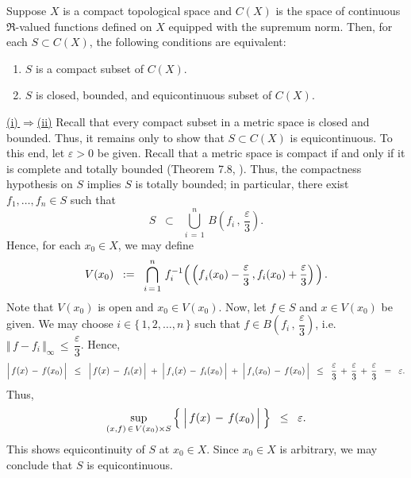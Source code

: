 \begin{theorem}
\label{ArzelaAscoliTheorem}
\mbox{}\vskip 0.1cm
\noindent
Suppose $X$ is a compact topological space and
$C(X)$ is the space of continuous $\Re$-valued functions defined on $X$ equipped with the supremum norm.
Then, for each $S \subset C(X)$, the following conditions are equivalent:
\begin{enumerate}
\item	$S$ is a compact subset of $C(X)$.
\item	$S$ is closed, bounded, and equicontinuous subset of $C(X)$.
\end{enumerate}
\end{theorem}
\proof
\vskip 0.1cm
\noindent
\underline{(i)\,\;$\Longrightarrow$\;(ii)}
\vskip 0.1cm
\noindent
Recall that every compact subset in a metric space is closed and bounded.
Thus, it remains only to show that $S \subset C(X)$ is equicontinuous.
To this end, let $\varepsilon > 0$ be given.
Recall that a metric space is compact if and only if it is complete and totally bounded (Theorem 7.8, \cite{Aliprantis1998}).
Thus, the compactness hypothesis on $S$ implies $S$ is totally bounded;
in particular, there exist $f_{1}, \ldots, f_{n} \in S$ such that
\begin{equation*}
S \;\; \subset \;\; \bigcup_{i\,=\,1}^{n}\,B\!\left(f_{i}\,,\,\dfrac{\varepsilon}{3}\right).
\end{equation*}
Hence, for each $x_{0} \in X$, we may define
\begin{equation*}
V(x_{0}) \;\; := \;\;
\bigcap_{i\,=\,1}^{n}\,
f_{i}^{-1}\!\left(\,
	\left(\overset{{\color{white}.}}{f}_{i}(x_{0})-\dfrac{\varepsilon}{3}\,,f_{i}(x_{0})+\dfrac{\varepsilon}{3}\right)
\,\right).
\end{equation*}
Note that $V(x_{0})$ is open and $x_{0} \in V(x_{0})$.
Now, let $f \in S$ and $x \in V(x_{0})$ be given.
We may choose $i \in \{\,1,2,\ldots,n\,\}$ such that $f \in B\!\left(f_{i}\,,\,\dfrac{\varepsilon}{3}\right)$,
i.e. $\Vert\,f-f_{i}\,\Vert_{\infty}\,\leq\,\dfrac{\varepsilon}{3}$.
Hence,
\begin{equation*}
\left\vert\,\overset{{\color{white}.}}{f}(x) \,-\, f(x_{0})\,\right\vert
\;\;\leq\;\; \left\vert\,\overset{{\color{white}.}}{f}(x) \,-\, f_{i}(x)\,\right\vert
		\;+\;\left\vert\,\overset{{\color{white}.}}{f}_{i}(x) \,-\, f_{i}(x_{0})\,\right\vert
		\;+\;\left\vert\,\overset{{\color{white}.}}{f}_{i}(x_{0}) \,-\, f(x_{0})\,\right\vert
\;\;\leq\;\; \dfrac{\varepsilon}{3} \,+\, \dfrac{\varepsilon}{3} \,+\, \dfrac{\varepsilon}{3}
\;\; = \;\; \varepsilon.
\end{equation*}
Thus,
\begin{equation*}
\underset{(x,f)\,\in\,V(x_{0}) \times S}{\sup}
\left\{\;
\left\vert\,\overset{{\color{white}.}}{f}(x) \,-\, f(x_{0})\,\right\vert
\;\right\}
\;\; \leq \;\; \varepsilon.
\end{equation*}
This shows equicontinuity of $S$ at $x_{0} \in X$.
Since $x_{0} \in X$ is arbitrary, we may conclude that $S$ is equicontinuous.

